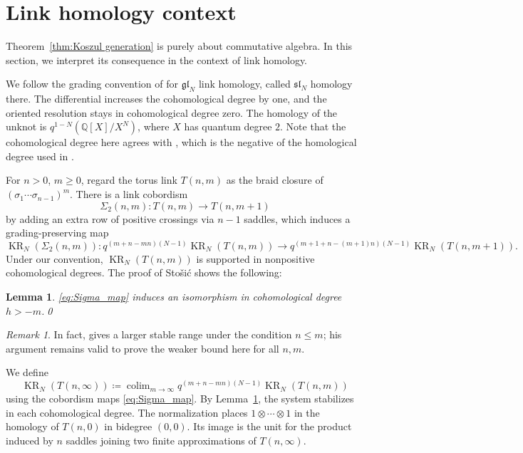 \documentclass[reqno]{amsart}
\newtheorem{lem}[thm]{Lemma}
\theoremstyle{definition}
\theoremstyle{remark}
\newtheorem{rem}[thm]{Remark}
\newcommand{\QQ}{\mathbb{Q}}
\newcommand{\gl}{\mathfrak{gl}}
\DeclareMathOperator{\KR}{KR}
\begin{document}
\section{Link homology context}
\label{sec:stable torus homology}

Theorem~\ref{thm:Koszul generation} is purely about commutative algebra. In this section, we interpret its consequence in the context of link homology.

We follow the grading convention of \cite{khovanov2008matrix} for $\gl_N$ link homology, called $\mathfrak{sl}_N$ homology there. The differential increases the cohomological degree by one, and the oriented resolution stays in cohomological degree zero. The homology of the unknot is $q^{1-N}(\QQ[X]/X^N)$, where $X$ has quantum degree $2$. Note that the cohomological degree here agrees with \cite{ballinger2025stable}, which is the negative of the homological degree used in \cite{gorsky2013stable}.

For $n>0$, $m\ge0$, regard the torus link $T(n,m)$ as the braid closure of $(\sigma_1\cdots\sigma_{n-1})^m$. There is a link cobordism \[\Sigma_2(n,m)\colon T(n,m)\to T(n,m+1)\] by adding an extra row of positive crossings via $n-1$ saddles, which induces a grading-preserving map
\begin{equation}\label{eq:Sigma_map}
\KR_N(\Sigma_2(n,m))\colon q^{(m+n-mn)(N-1)}\KR_N(T(n,m))\to q^{(m+1+n-(m+1)n)(N-1)}\KR_N(T(n,m+1)).
\end{equation}
Under our convention, $\KR_N(T(n,m))$ is supported in nonpositive cohomological degrees. The proof of Sto\v{s}i\'{c} \cite[Theorem~5.1]{stosic2007homological} shows the following:
\begin{lem}\label{lem:stosic_stable_range}
\eqref{eq:Sigma_map} induces an isomorphism in cohomological degree $h>-m$.\qed
\end{lem}

\begin{rem}
In fact, \cite[Theorem~5.1]{stosic2007homological} gives a larger stable range under the condition $n\le m$; his argument remains valid to prove the weaker bound here for all $n,m$.
\end{rem}

We define
\[
\KR_N(T(n,\infty))\coloneqq\operatorname{colim}_{m\to\infty}q^{(m+n-mn)(N-1)}\KR_N(T(n,m))
\]
using the cobordism maps \eqref{eq:Sigma_map}. By Lemma~\ref{lem:stosic_stable_range}, the system stabilizes in each cohomological degree. The normalization places $1\otimes\cdots\otimes1$ in the homology of $T(n,0)$ in bidegree $(0,0)$. Its image is the unit for the product induced by $n$ saddles joining two finite approximations of $T(n,\infty)$.
\end{document}
